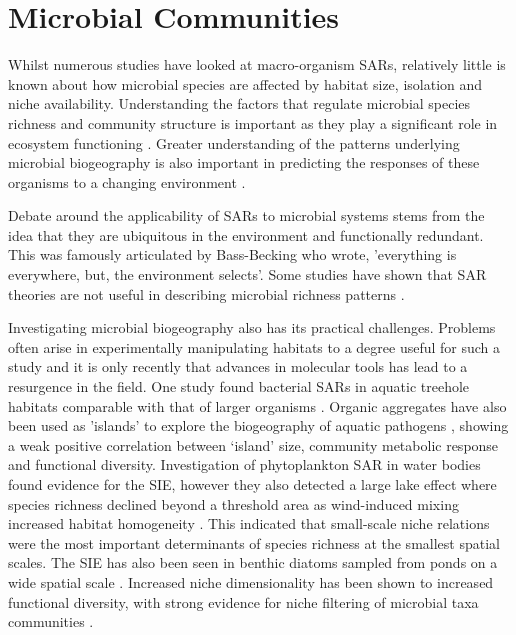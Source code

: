 \section{Microbial Communities}

\indent Whilst numerous studies have looked at macro-organism SARs, relatively little is known about how microbial species are affected by habitat size, isolation and niche availability. Understanding the factors that regulate microbial species richness and community structure is important as they play a significant role in ecosystem functioning \cite{griffiths2011bacterial}. Greater understanding of the patterns underlying microbial biogeography is also important in predicting the responses of these organisms to a changing environment \cite{bradley2017microbial}.\

\indent Debate around the applicability of SARs to microbial systems stems from the idea that they are ubiquitous in the environment and functionally redundant. This was famously articulated by Bass-Becking \cite{baas1934geobiologie} who wrote, 'everything is everywhere, but, the environment selects'. Some studies have shown that SAR theories are not useful in describing microbial richness patterns \cite{fierer2006diversity} \cite{henebry1980effect}. \

\indent Investigating microbial biogeography also has its practical challenges. Problems often arise in experimentally manipulating habitats to a degree useful for such a study and it is only recently that advances in molecular tools has lead to a resurgence in the field. One study found bacterial SARs in aquatic treehole habitats comparable with that of larger organisms \cite{bell2005larger}. Organic aggregates have also been used as 'islands' to explore the biogeography of aquatic pathogens \cite{lyons2010theory}, showing a weak positive correlation between ‘island’ size, community metabolic response and functional diversity. Investigation of phytoplankton SAR in water bodies found evidence for the SIE, however they also detected a large lake effect where species richness declined beyond a threshold area as wind-induced mixing increased habitat homogeneity \cite{varbiro2017functional}. This indicated that small-scale niche relations were the most important determinants of species richness at the smallest spatial scales. The SIE has also been seen in benthic diatoms sampled from ponds on a wide spatial scale \cite{bolgovics2016species}. Increased niche dimensionality has been shown to increased functional diversity, with strong evidence for niche filtering of microbial taxa communities \cite{KevinLee2016Nfob}.\

